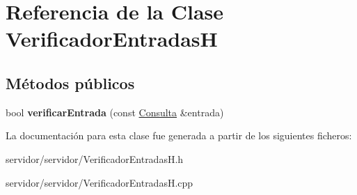 \hypertarget{classVerificadorEntradasH}{\section{\-Referencia de la \-Clase \-Verificador\-Entradas\-H}
\label{classVerificadorEntradasH}
}
\subsection*{\-Métodos públicos}
\begin{DoxyCompactItemize}
\item 
\hypertarget{classVerificadorEntradasH_ab5e0fef4c0b66cfe581c7a0bddfe2307}{bool {\bfseries verificar\-Entrada} (const \hyperlink{classConsulta}{\-Consulta} \&entrada)}\label{classVerificadorEntradasH_ab5e0fef4c0b66cfe581c7a0bddfe2307}

\end{DoxyCompactItemize}


\-La documentación para esta clase fue generada a partir de los siguientes ficheros\-:\begin{DoxyCompactItemize}
\item 
servidor/servidor/\-Verificador\-Entradas\-H.\-h\item 
servidor/servidor/\-Verificador\-Entradas\-H.\-cpp\end{DoxyCompactItemize}
